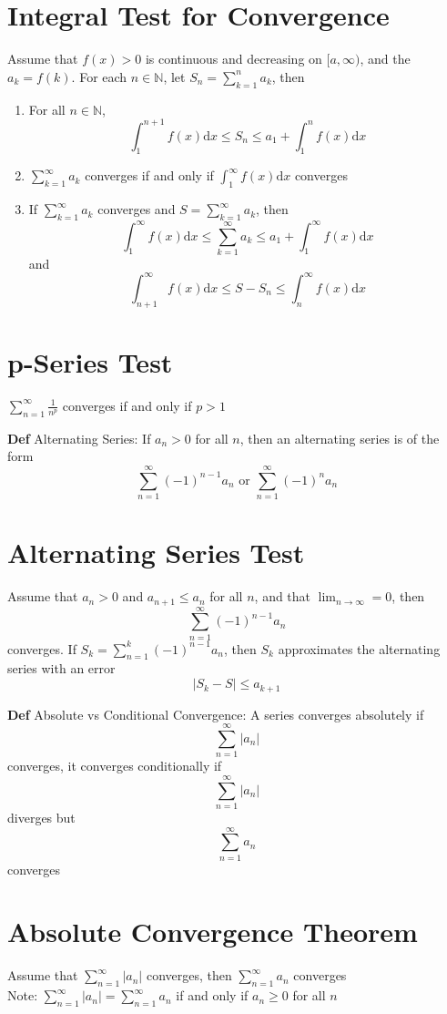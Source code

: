 \documentclass[11pt,notitlepage]{report}
\begin{document}
\section{Integral Test for Convergence}Assume that $f(x) > 0$ is continuous and decreasing on $[a, \infty)$, and the $a_k = f(k)$. For each $n \in \mathbb N$, let $S_n = \sum_{k=1}^n a_k$, then
\begin{enumerate}
    \item For all $n \in \mathbb N$,
    $$\int_1^{n+1}f(x)\mathrm{d}x \leq S_n \leq a_1 + \int_1^{n} f(x) \mathrm{d}x$$
    \item $\sum_{k=1}^\infty a_k$ converges if and only if $\int_1^\infty f(x) \mathrm{d}x$ converges
    \item If $\sum_{k=1}^\infty a_k$ converges and $S = \sum_{k=1}^\infty a_k$, then
    $$\int_1^\infty f(x) \mathrm{d}x \leq \sum_{k=1}^\infty a_k \leq a_1 + \int_1^\infty f(x) \mathrm{d}x$$
    and
    $$\int_{n+1}^\infty f(x) \mathrm{d}x \leq S - S_n \leq \int_n^\infty f(x) \mathrm{d}x$$
\end{enumerate}

\section{p-Series Test}$\sum_{n=1}^\infty \frac{1}{n^p}$ converges if and only if $p > 1$

\textbf{Def} Alternating Series: If $a_n > 0$ for all $n$, then an alternating series is of the form
$$\sum_{n=1}^\infty(-1)^{n-1} a_n \text{ or } \sum_{n=1}^\infty(-1)^n a_n$$

\section{Alternating Series Test}Assume that $a_n > 0$ and $a_{n+1} \leq a_n$ for all $n$, and that $\lim_{n \to \infty} = 0$, then
$$\sum_{n=1}^\infty (-1)^{n-1} a_n$$ converges. If $S_k = \sum_{n=1}^k (-1)^{n-1} a_n$, then $S_k$ approximates the alternating series with an error
$$|S_k - S| \leq a_{k+1}$$

\newpage
\textbf{Def} Absolute vs Conditional Convergence: A series converges absolutely if
$$\sum_{n=1}^\infty |a_n|$$ converges, it converges conditionally if $$\sum_{n=1}^\infty |a_n|$$ diverges but $$\sum_{n=1}^\infty a_n$$ converges

\section{Absolute Convergence Theorem}Assume that $\sum_{n=1}^\infty |a_n|$ converges, then $\sum_{n=1}^\infty a_n$ converges\\
\hspace*{5mm} Note: $\sum_{n=1}^\infty |a_n| = \sum_{n=1}^\infty a_n$ if and only if $a_n \geq 0$ for all $n$
\end{document}
